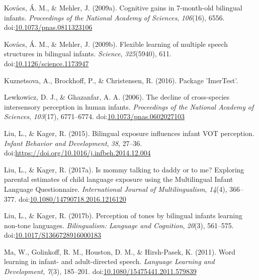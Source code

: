 \documentclass[,man,floatsintext]{apa6}
\begin{document}
\leavevmode\hypertarget{ref-kovacs_2009a}{}%
Kovács, Á. M., \& Mehler, J. (2009a). Cognitive gains in 7-month-old bilingual infants. \emph{Proceedings of the National Academy of Sciences}, \emph{106}(16), 6556. doi:\href{https://doi.org/10.1073/pnas.0811323106}{10.1073/pnas.0811323106}

\leavevmode\hypertarget{ref-kovacs_2009b}{}%
Kovács, Á. M., \& Mehler, J. (2009b). Flexible learning of multiple speech structures in bilingual infants. \emph{Science}, \emph{325}(5940), 611. doi:\href{https://doi.org/10.1126/science.1173947}{10.1126/science.1173947}

\leavevmode\hypertarget{ref-kuznetsova_2016}{}%
Kuznetsova, A., Brockhoff, P., \& Christensen, R. (2016). Package 'ImerTest'.

\leavevmode\hypertarget{ref-lewkowicz_2006}{}%
Lewkowicz, D. J., \& Ghazanfar, A. A. (2006). The decline of cross-species intersensory perception in human infants. \emph{Proceedings of the National Academy of Sciences}, \emph{103}(17), 6771--6774. doi:\href{https://doi.org/10.1073/pnas.0602027103}{10.1073/pnas.0602027103}

\leavevmode\hypertarget{ref-liu_2015}{}%
Liu, L., \& Kager, R. (2015). Bilingual exposure influences infant VOT perception. \emph{Infant Behavior and Development}, \emph{38}, 27--36. doi:\href{https://doi.org/https://doi.org/10.1016/j.infbeh.2014.12.004}{https://doi.org/10.1016/j.infbeh.2014.12.004}

\leavevmode\hypertarget{ref-liu_2017a}{}%
Liu, L., \& Kager, R. (2017a). Is mommy talking to daddy or to me? Exploring parental estimates of child language exposure using the Multilingual Infant Language Questionnaire. \emph{International Journal of Multilingualism}, \emph{14}(4), 366--377. doi:\href{https://doi.org/10.1080/14790718.2016.1216120}{10.1080/14790718.2016.1216120}

\leavevmode\hypertarget{ref-liu_2017b}{}%
Liu, L., \& Kager, R. (2017b). Perception of tones by bilingual infants learning non-tone languages. \emph{Bilingualism: Language and Cognition}, \emph{20}(3), 561--575. doi:\href{https://doi.org/10.1017/S1366728916000183}{10.1017/S1366728916000183}

\leavevmode\hypertarget{ref-ma_2011}{}%
Ma, W., Golinkoff, R. M., Houston, D. M., \& Hirsh-Pasek, K. (2011). Word learning in infant- and adult-directed speech. \emph{Language Learning and Development}, \emph{7}(3), 185--201. doi:\href{https://doi.org/10.1080/15475441.2011.579839}{10.1080/15475441.2011.579839}
\end{document}
